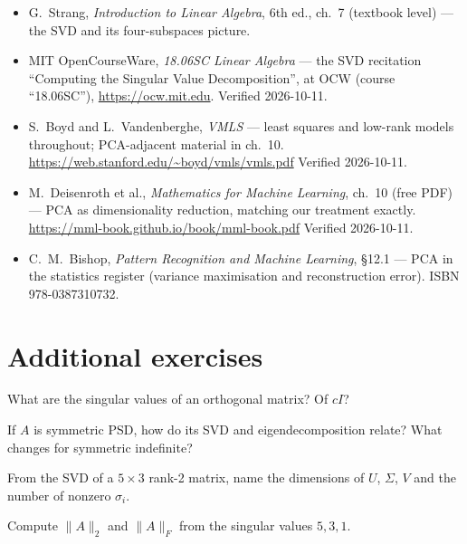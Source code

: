 \begin{itemize}
\item G.~Strang, \emph{Introduction to Linear Algebra}, 6th ed., ch.~7
(textbook level) --- the SVD and its four-subspaces picture.
\item MIT OpenCourseWare, \emph{18.06SC Linear Algebra} --- the SVD
recitation ``Computing the Singular Value Decomposition'', at OCW
(course ``18.06SC''), \url{https://ocw.mit.edu}. Verified 2026-10-11.
\item S.~Boyd and L.~Vandenberghe, \emph{VMLS} --- least squares and
low-rank models throughout; PCA-adjacent material in ch.~10.
\newline
\url{https://web.stanford.edu/~boyd/vmls/vmls.pdf}
Verified 2026-10-11.
\item M.~Deisenroth et al., \emph{Mathematics for Machine Learning},
ch.~10 (free PDF) --- PCA as dimensionality reduction, matching our
treatment exactly.\newline
\url{https://mml-book.github.io/book/mml-book.pdf}
Verified 2026-10-11.
\item C.~M.~Bishop, \emph{Pattern Recognition and Machine Learning},
\S12.1 --- PCA in the statistics register (variance maximisation and
reconstruction error).\newline
ISBN 978-0387310732.
\end{itemize}

\section*{Additional exercises}

\begin{exercise}[easy]
What are the singular values of an orthogonal matrix? Of $cI$?
\end{exercise}

\begin{exercise}[easy]
If $A$ is symmetric PSD, how do its SVD and eigendecomposition relate?
What changes for symmetric indefinite?
\end{exercise}

\begin{exercise}[easy]
From the SVD of a $5\times3$ rank-2 matrix, name the dimensions of $U$,
$\Sigma$, $V$ and the number of nonzero $\sigma_i$.
\end{exercise}

\begin{exercise}[easy]
Compute $\lVert A\rVert_2$ and $\lVert A\rVert_F$ from the singular
values $5,3,1$.
\end{exercise}

